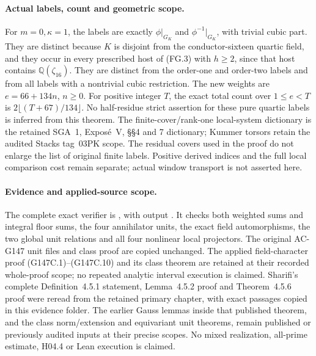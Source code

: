 \paragraph{Actual labels, count and geometric scope.}
For $m=0,\kappa=1$, the labels are exactly
$\phi|_{G_K}$ and $\phi^{-1}|_{G_K}$, with trivial cubic part.
They are distinct because $K$ is disjoint from the conductor-sixteen
quartic field, and they occur in every prescribed host of (FG.3)
with $h\geq2$, since that host contains $\mathbb Q(\zeta_{16})$.
They are distinct from the order-one and order-two labels and
from all labels with a nontrivial cubic restriction.
The new weights are $e=66+134n$, $n\geq0$.
For positive integer $T$, the exact total count over $1\leq e<T$ is
$2\lfloor(T+67)/134\rfloor$.
No half-residue strict assertion for these pure quartic labels
is inferred from this theorem.
The finite-cover/rank-one local-system dictionary is the retained
SGA~1, Expos\'e~V, \S\S4 and 7 dictionary; Kummer torsors retain
the audited Stacks tag~03PK scope.
The residual covers used in the proof do not enlarge the list
of original finite labels.  Positive derived indices and the
full local comparison cost remain separate; actual window
transport is not asserted here.

\paragraph{Evidence and applied-source scope.}
The complete exact verifier is
, with output
.
It checks both weighted sums and integral floor sums, the four
annihilator units, the exact field automorphisms, the two global
unit relations and all four nonlinear local projectors.
The original AC-G147 unit files and class proof are copied unchanged.
The applied field-character proof (G147C.1)--(G147C.10) and its
class theorem are retained at their recorded whole-proof scope;
no repeated analytic interval execution is claimed.
Sharifi's complete Definition~4.5.1 statement, Lemma~4.5.2 proof
and Theorem~4.5.6 proof were reread from the retained primary
chapter, with exact passages copied in this evidence folder.
The earlier Gauss lemmas inside that published theorem, and
the class norm/extension and equivariant unit theorems, remain
published or previously audited inputs at their precise scopes.
No mixed realization, all-prime estimate, H04.4 or Lean execution
is claimed.

